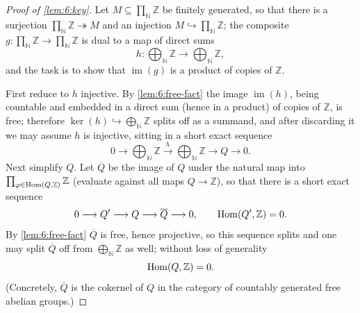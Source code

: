 \begin{proof}[Proof of \cref{lem:6:key}]
Let $M\subseteq\prod_{\mathbb{N}}\mathbb{Z}$ be finitely generated, so that there
is a surjection $\prod_{\mathbb{N}}\mathbb{Z}\twoheadrightarrow M$ and an
injection $M\hookrightarrow\prod_{\mathbb{N}}\mathbb{Z}$; the composite
$g\colon\prod_{\mathbb{N}}\mathbb{Z}\to\prod_{\mathbb{N}}\mathbb{Z}$ is dual to a
map of direct sums
\begin{equation*}
h\colon\bigoplus_{\mathbb{N}}\mathbb{Z}\longrightarrow\bigoplus_{\mathbb{N}}\mathbb{Z},
\end{equation*}
and the task is to show that $\operatorname{im}(g)$ is a product of copies of
$\mathbb{Z}$.

First reduce to $h$ injective. By \cref{lem:6:free-fact} the image
$\operatorname{im}(h)$, being countable and embedded in a direct sum (hence in a
product) of copies of $\mathbb{Z}$, is free; therefore
$\ker(h)\hookrightarrow\bigoplus_{\mathbb{N}}\mathbb{Z}$ splits off as a summand,
and after discarding it we may assume $h$ is injective, sitting in a short exact
sequence
\begin{equation}
\label{eq:6:h-ses}
0\longrightarrow\bigoplus_{\mathbb{N}}\mathbb{Z}\xrightarrow{\ h\ }
\bigoplus_{\mathbb{N}}\mathbb{Z}\longrightarrow Q\longrightarrow0.
\end{equation}
Next simplify $Q$. Let $\overline{Q}$ be the image of $Q$ under the natural map
into $\prod_{\varphi\in\operatorname{Hom}(Q,\mathbb{Z})}\mathbb{Z}$ (evaluate against all maps
$Q\to\mathbb{Z}$), so that there is a short exact sequence
\begin{equation*}
0\longrightarrow Q'\longrightarrow Q\longrightarrow\overline{Q}\longrightarrow0,
\qquad \operatorname{Hom}(Q',\mathbb{Z})=0 .
\end{equation*}
By \cref{lem:6:free-fact} $\overline{Q}$ is free, hence projective, so this
sequence splits and one may split $\overline{Q}$ off from
$\bigoplus_{\mathbb{N}}\mathbb{Z}$ as well; without loss of generality
\begin{equation*}
\operatorname{Hom}(Q,\mathbb{Z})=0 .
\end{equation*}
(Concretely, $\overline{Q}$ is the cokernel of $Q$ in the category of countably
generated free abelian groups.)


\end{proof}
